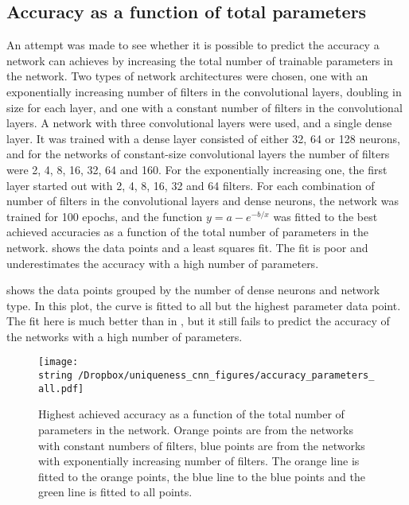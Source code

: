 \subsection{Accuracy as a function of total parameters}

An attempt was made to see whether it is possible to predict the accuracy a network can achieves by increasing the total number of trainable parameters in the network. Two types of network architectures were chosen, one with an exponentially increasing number of filters in the convolutional layers, doubling in size for each layer, and one with a constant number of filters in the convolutional layers. A network with three convolutional layers were used, and a single dense layer. It was trained with a dense layer consisted of either 32, 64 or 128 neurons, and for the networks of constant-size convolutional layers the number of filters were 2, 4, 8, 16, 32, 64 and 160. For the exponentially increasing one, the first layer started out with 2, 4, 8, 16, 32 and 64 filters. For each combination of number of filters in the convolutional layers and dense neurons, the network was trained for 100 epochs, and the function $y = a - e^{-b/x}$ was fitted to the best achieved accuracies as a function of the total number of parameters in the network.  shows the data points and a least squares fit. The fit is poor and underestimates the accuracy with a high number of parameters.

 shows the data points grouped by the number of dense neurons and network type. In this plot, the curve is fitted to all but the highest parameter data point. The fit here is much better than in , but it still fails to predict the accuracy of the networks with a high number of parameters.

\begin{figure}
  \begin{center}
    \texttt{[image: \\string~/Dropbox/uniqueness\_cnn\_figures/accuracy\_parameters\_all.pdf]}
  \end{center}
  \vspace{5mm}
  \caption{Highest achieved accuracy as a function of the total number of parameters in the network. Orange points are from the networks with constant numbers of filters, blue points are from the networks with exponentially increasing number of filters. The orange line is fitted to the orange points, the blue line to the blue points and the green line is fitted to all points.}
  \label{fig:accuracy_parameters_all}
\end{figure}


